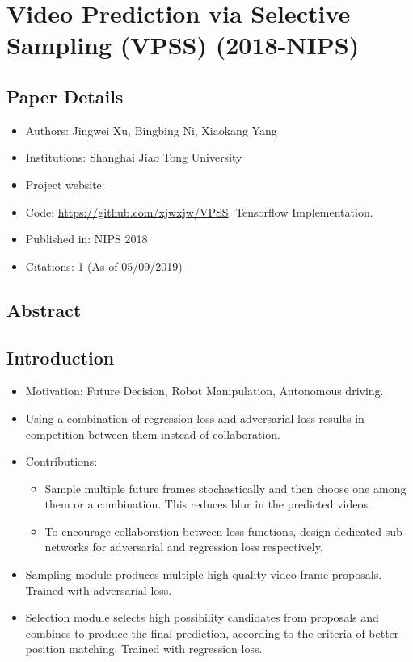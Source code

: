 \documentclass{article}
\begin{document}
    \section{Video Prediction via Selective Sampling (VPSS) (2018-NIPS)}\label{sec:Video_Prediction_via_Selective_Sampling_(VPSS)_(2018_NIPS)}
    \subsection*{Paper Details}
    \begin{itemize}
        \item Authors: Jingwei Xu, Bingbing Ni, Xiaokang Yang
        \item Institutions: Shanghai Jiao Tong University
        \item Project website:
        \item Code: \url{https://github.com/xjwxjw/VPSS}.
        Tensorflow Implementation.
        \item Published in: NIPS 2018
        \item Citations: 1 (As of 05/09/2019)
    \end{itemize}

    \subsection*{Abstract}

    \subsection{Introduction}\label{subsec:Video_Prediction_via_Selective_Sampling_(VPSS)_(2018_NIPS):introduction}
    \begin{itemize}
        \item Motivation: Future Decision, Robot Manipulation, Autonomous driving.
        \item Using a combination of regression loss and adversarial loss results in competition between them instead of collaboration.
        \item Contributions:
        \begin{itemize}
            \item Sample multiple future frames stochastically and then choose one among them or a combination.
            This reduces blur in the predicted videos.
            \item To encourage collaboration between loss functions, design dedicated sub-networks for adversarial and regression loss respectively.
        \end{itemize}
        \item Sampling module produces multiple high quality video frame proposals.
        Trained with adversarial loss.
        \item Selection module selects high possibility candidates from proposals and combines to produce the final prediction, according to the criteria of better position matching.
        Trained with regression loss.
    \end{itemize}
\end{document}
